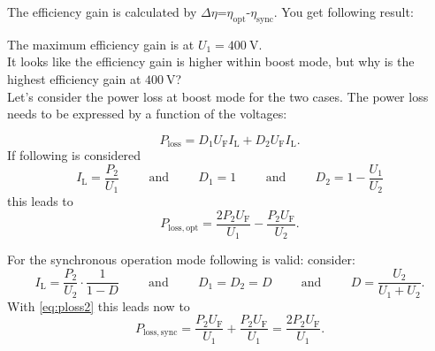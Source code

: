 \begin{solutionblock}
    The efficiency gain is calculated by $\Delta \eta$=$\eta_\mathrm{opt}$-$\eta_\mathrm{sync}$.
    You get following result:

    
    
    The maximum efficiency gain is at $U_\mathrm{1}=\SI{400}{\volt}$. \\
    It looks like the efficiency gain is higher within boost mode,
     but why is the highest efficiency gain at $\SI{400}{\volt}$? \\
    Let's consider the power loss at boost mode for the two cases. The power loss needs to be expressed by a function of the voltages:

    \begin{equation}
        P_\mathrm{loss}=D_1 U_\mathrm{F} I_\mathrm{L} + D_2 U_\mathrm{F} I_\mathrm{L}.
        \label{eq:ploss2}
    \end{equation}
    If following is considered
    \begin{equation}
        I_\mathrm{L}=\frac{P_\mathrm{2}}{U_\mathrm{1}} 
        \hspace{1cm} \mathrm{and} \hspace{1cm}
        D_1=1
        \hspace{1cm} \mathrm{and} \hspace{1cm}
        D_2=1-\frac{U_\mathrm{1}}{U_\mathrm{2}} 
    \end{equation}
    this leads to
    \begin{equation}
        P_\mathrm{loss,opt}=\frac{2 P_\mathrm{2} U_\mathrm{F}}{U_\mathrm{1}} - \frac{P_\mathrm{2} U_\mathrm{F}}{U_\mathrm{2}}.
    \end{equation}

    For the synchronous operation mode following is valid:
    consider:
    \begin{equation}
        I_\mathrm{L}=\frac{P_\mathrm{2}}{U_\mathrm{2}} \cdot \frac{1}{1-D}  
        \hspace{1cm} \mathrm{and} \hspace{1cm}
        D_1=D_2=D
        \hspace{1cm} \mathrm{and} \hspace{1cm}
        D=\frac{U_\mathrm{2}}{U_\mathrm{1}+U_\mathrm{2}}.
    \end{equation}
    With \eqref{eq:ploss2} this leads now to
    \begin{equation}
        P_\mathrm{loss,sync}=\frac{P_\mathrm{2} U_\mathrm{F}}{U_\mathrm{1}} + \frac{P_\mathrm{2} U_\mathrm{F}}{U_\mathrm{1}}=\frac{2 P_\mathrm{2} U_\mathrm{F}}{U_\mathrm{1}}.
    \end{equation}


\end{solutionblock}
